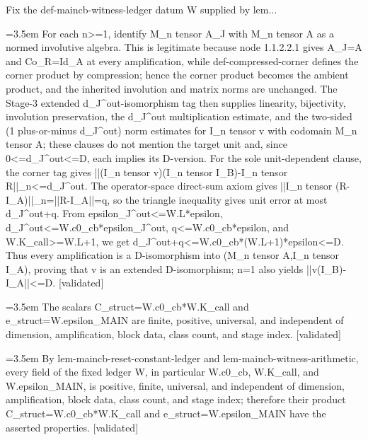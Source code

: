 \documentclass{article}
\newcommand{\step}[1]{\par\noindent\hangindent=3.5em\hangafter=1%
  \makebox[3.5em][l]{\textbf{#1.}}}
\newcommand{\steptag}[1]{\hfill{\small\textsf{[#1]}}}
\begin{document}
\begin{proofbox}{Fix the def-maincb-witness-ledger datum W supplied by lem...}
\step{1.1.2.2.2.4.1.1} For each n>=1, identify M\_n tensor A\_J with M\_n tensor A as a normed involutive algebra. This is legitimate because node 1.1.2.2.1 gives A\_J=A and Co\_R=Id\_A at every amplification, while def-compressed-corner defines the corner product by compression; hence the corner product becomes the ambient product, and the inherited involution and matrix norms are unchanged. The Stage-3 extended d\_J\textasciicircum{}out-isomorphism tag then supplies linearity, bijectivity, involution preservation, the d\_J\textasciicircum{}out multiplication estimate, and the two-sided (1 plus-or-minus d\_J\textasciicircum{}out) norm estimates for I\_n tensor v with codomain M\_n tensor A; these clauses do not mention the target unit and, since 0<=d\_J\textasciicircum{}out<=D, each implies its D-version. For the sole unit-dependent clause, the corner tag gives ||(I\_n tensor v)(I\_n tensor I\_B)-I\_n tensor R||\_n<=d\_J\textasciicircum{}out. The operator-space direct-sum axiom gives ||I\_n tensor (R-I\_A)||\_n=||R-I\_A||=q, so the triangle inequality gives unit error at most d\_J\textasciicircum{}out+q. From epsilon\_J\textasciicircum{}out<=W.L*epsilon, d\_J\textasciicircum{}out<=W.c0\_cb*epsilon\_J\textasciicircum{}out, q<=W.c0\_cb*epsilon, and W.K\_call>=W.L+1, we get d\_J\textasciicircum{}out+q<=W.c0\_cb*(W.L+1)*epsilon<=D. Thus every amplification is a D-isomorphism into (M\_n tensor A,I\_n tensor I\_A), proving that v is an extended D-isomorphism; n=1 also yields ||v(I\_B)-I\_A||<=D. \steptag{validated} \\[4pt]
\step{1.2} The scalars C\_struct=W.c0\_cb*W.K\_call and e\_struct=W.epsilon\_MAIN are finite, positive, universal, and independent of dimension, amplification, block data, class count, and stage index. \steptag{validated} \\[6pt]
\step{1.2.1} By lem-maincb-reset-constant-ledger and lem-maincb-witness-arithmetic, every field of the fixed ledger W, in particular W.c0\_cb, W.K\_call, and W.epsilon\_MAIN, is positive, finite, universal, and independent of dimension, amplification, block data, class count, and stage index; therefore their product C\_struct=W.c0\_cb*W.K\_call and e\_struct=W.epsilon\_MAIN have the asserted properties. \steptag{validated} \\[4pt]
\end{proofbox}
\end{document}
